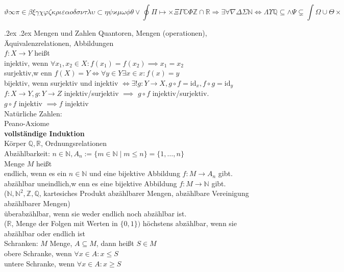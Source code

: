 \documentclass[9pt, landscape,a4paper]{extarticle}
\makeatletter
\renewcommand{\section}{\@startsection{section}{1}{0mm}%
                                {.2ex}%
                                {.2ex}%
                                {\sffamily\small\bfseries}}
\newcommand\id{\mathrm{id}}
\makeatother
\begin{document}
\small
\[ϑ∞π∈βξγχφζκριεαοδσντλυ⊂ηψϰμωϕθ∨∮Π↦×ΞΓℂΦℤ∩ℝ⇒∃∀∇ΔΣℕ⇔ΛΥℚ⊆∧Ψ⊊∫Ω∪Θ×\]
\begin{multicols*}{4}
\raggedcolumns
  \section{Mengen und Zahlen}
  Quantoren, Mengen (operationen), Äquivalenzrelationen, Abbildungen \\
  $f: X\to Y$ heißt \\
  injektiv, wenn $\forall x_1, x_2 \in X: f(x_1) = f(x_2) \implies x_1 = x_2$ \\
  surjektiv,w enn $f(X) = Y \iff \forall y\in Y \exists x\in x: f(x) = y$ \\
  bijektiv, wenn surjektiv und injektiv $\iff \exists ! g: Y \to X, g\circ f = \id_x, f\circ g = \id_y$ \\
  $f: X\to Y, g: Y\to Z$ injektiv/surjektiv $\implies$ $g\circ f$ injektiv/surjektiv. \\
  $g\circ f$ injektiv $\implies f$ injektiv \\
  Natürliche Zahlen: \\
  Peano-Axiome \\
  \textbf{vollständige Induktion} \\
  Körper $\mathbb{Q}, \mathbb{R}$, Ordnungsrelationen \\
  Abzählbarkeit: $n\in \mathbb{N}, A_n := \{m\in \mathbb{N} \mid m\leq n\} = \{1, \ldots, n\}$ \\
  Menge $M$ heißt \\
  endlich, wenn es ein $n\in\mathbb{N}$ und eine bijektive Abbildung $f: M \to A_n$ gibt. \\
  abzählbar uneindlich,w enn es eine bijektive Abbildung $f: M\to \mathbb{N}$ gibt. \\
    ($\mathbb{N}, \mathbb{N}^2, \mathbb{Z}, \mathbb{Q}$, kartesiches Produkt abzählbarer Mengen, abzählbare Vereinigung abzählbarer Mengen) \\
  überabzählbar, wenn sie weder endlich noch abzählbar ist. \\
    ($\mathbb{R}$, Menge der Folgen mit Werten in $\{0, 1\})$
  höchstens abzählbar, wenn sie abzählbar oder endlich ist \\
  Schranken: $M$ Menge, $A\subseteq M$, dann heißt $S\in M$ \\
  obere Schranke, wenn $\forall x\in A: x\leq S$ \\
  untere Schranke, wenn $\forall x\in A: x\geq S$ \\

\end{multicols*}
\end{document}
